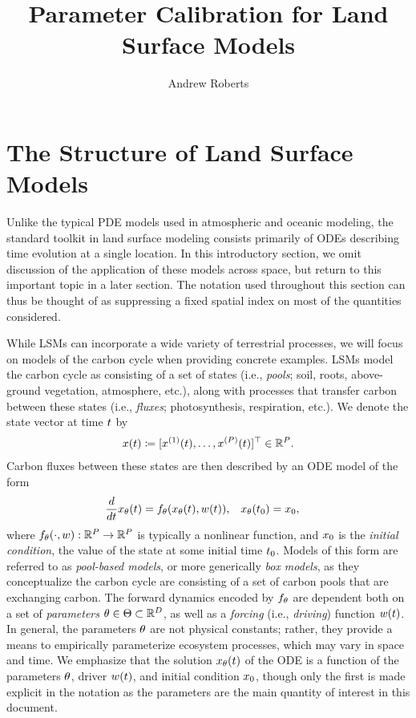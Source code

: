 \documentclass[12pt]{article}
\title{Parameter Calibration for Land Surface Models}
\author{Andrew Roberts}
\begin{document}
\maketitle

\section{The Structure of Land Surface Models}
Unlike the typical PDE models used in atmospheric and oceanic modeling, the standard toolkit in land surface modeling 
consists primarily of ODEs describing time evolution at a single location. In this introductory section, we omit discussion 
of the application of these models across space, but return to this important topic in a later section. The notation 
used throughout this section can thus be thought of as suppressing a fixed spatial index on most of the quantities considered. 

While LSMs can incorporate a wide 
variety of terrestrial processes, we will focus on models of the carbon cycle when providing concrete examples. 
LSMs model the carbon cycle as consisting of a set of states (i.e., \textit{pools}; soil, roots, above-ground vegetation, atmosphere, etc.),
along with processes that transfer carbon between these states (i.e., \textit{fluxes}; photosynthesis, respiration, etc.). 
We denote the state vector at time $\Time$ by 
\begin{align}
\state(\Time) \Def [\indexState[1]{\state}(\Time), \dots, \indexState[\dimState]{\state}(\Time)]^\top \in \R^{\dimState}.
\end{align}
Carbon fluxes between these states are then described by an ODE model of the form
\begin{align}
&\frac{d}{d\Time} \state_{\Par}(\Time) = \funcODE_{\Par}(\state_{\Par}(\Time), \forcing(\Time)), &&\state_{\Par}(\timeInitState) = \stateInit, 
\end{align}
where $\funcODE_{\Par}(\cdot, \forcing): \R^{\dimState} \to \R^{\dimState}$ is typically a nonlinear function, and $\stateInit$ is the \textit{initial condition}, 
the value of the state at some initial time $\timeInitState$. Models of this form are referred to as \textit{pool-based models}, or more generically 
\textit{box models}, as they conceptualize the carbon cycle are consisting of a set of carbon pools that are exchanging carbon. 
The forward dynamics encoded by $\funcODE_{\Par}$ are dependent both on a set of 
\textit{parameters} $\Par \in \parSpace \subset \R^{\dimPar}$, as well as a \textit{forcing} (i.e., \textit{driving}) function $\forcing(\Time)$.
In general, the parameters $\Par$ are not physical constants; rather, they provide a means to empirically parameterize ecosystem 
processes, which may vary in space and time.   
We emphasize that the solution $\state_{\Par}(\Time)$ of the ODE is a function of the parameters $\Par$, driver $\forcing(\Time)$, and 
initial condition $\stateInit$, though only the first is made explicit in the notation as the parameters are the main quantity of interest in this document.
\end{document}

